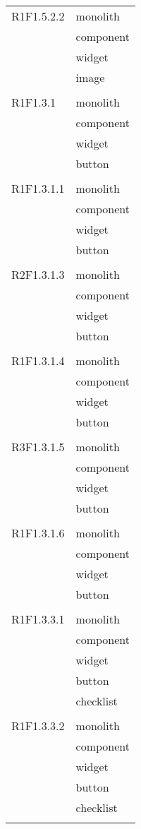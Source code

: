 \begin{center}
\begin{longtable}{|p{7cm}|p{5cm}|}
		R1F1.5.2.2 & monolith \\ & component \\ & widget \\ & image \\ & \\ \hline
		R1F1.3.1 & monolith \\ & component \\ & widget \\ & button \\ & \\ \hline
		R1F1.3.1.1 & monolith \\ & component \\ & widget \\ & button \\ & \\ \hline
		R2F1.3.1.3 & monolith \\ & component \\ & widget \\ & button \\ & \\ \hline
		R1F1.3.1.4 & monolith \\ & component \\ & widget \\ & button \\ & \\ \hline
		R3F1.3.1.5 & monolith \\ & component \\ & widget \\ & button \\ & \\ \hline
		R1F1.3.1.6 & monolith \\ & component \\ & widget \\ & button \\ & \\ \hline
		R1F1.3.3.1 & monolith \\ & component \\ & widget \\ & button \\ & checklist \\ & \\ \hline
		R1F1.3.3.2 & monolith \\ & component \\ & widget \\ & button \\ & checklist \\ & \\ \hline

\end{longtable}
\end{center}
